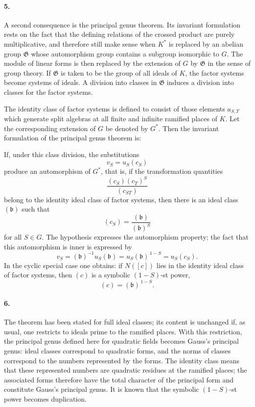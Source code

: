 \documentclass[11pt]{article}
\begin{document}
\paragraph{5.}
A second consequence is the principal genus theorem. Its invariant formulation rests on the fact that the defining relations of the crossed product are purely multiplicative, and therefore still make sense when \(K^*\) is replaced by an abelian group \(\mathfrak G\) whose automorphism group contains a subgroup isomorphic to \(G\). The module of linear forms is then replaced by the extension of \(G\) by \(\mathfrak G\) in the sense of group theory. If \(\mathfrak G\) is taken to be the group of all ideals of \(K\), the factor systems become systems of ideals. A division into classes in \(\mathfrak G\) induces a division into classes for the factor systems.

The identity class of factor systems is defined to consist of those elements \(a_{S,T}\) which generate split algebras at all finite and infinite ramified places of \(K\). Let the corresponding extension of \(G\) be denoted by \(G^*\). Then the invariant formulation of the principal genus theorem is:

If, under this class division, the substitutions
\[
        v_S=u_S(c_S)
\]
produce an automorphism of \(G^*\), that is, if the transformation quantities
\[
        \frac{(c_S)(c_T)^S}{(c_{ST})}
\]
belong to the identity ideal class of factor systems, then there is an ideal class \((\mathfrak b)\) such that
\[
        (c_S)=\frac{(\mathfrak b)}{(\mathfrak b)^S}
\]
for all \(S\in G\). The hypothesis expresses the automorphism property; the fact that this automorphism is inner is expressed by
\[
        v_S=(\mathfrak b)^{-1}u_S(\mathfrak b)
        =u_S(\mathfrak b)^{\,1-S}=u_S(c_S).
\]
In the cyclic special case one obtains: if \(N([c])\) lies in the identity ideal class of factor systems, then \((c)\) is a symbolic \((1-S)\)-st power,
\[
        (c)=(\mathfrak b)^{\,1-S}.
\]

\paragraph{6.}
The theorem has been stated for full ideal classes; its content is unchanged if, as usual, one restricts to ideals prime to the ramified places. With this restriction, the principal genus defined here for quadratic fields becomes Gauss's principal genus: ideal classes correspond to quadratic forms, and the norms of classes correspond to the numbers represented by the forms. The identity class means that these represented numbers are quadratic residues at the ramified places; the associated forms therefore have the total character of the principal form and constitute Gauss's principal genus. It is known that the symbolic \((1-S)\)-st power becomes duplication.
\end{document}
